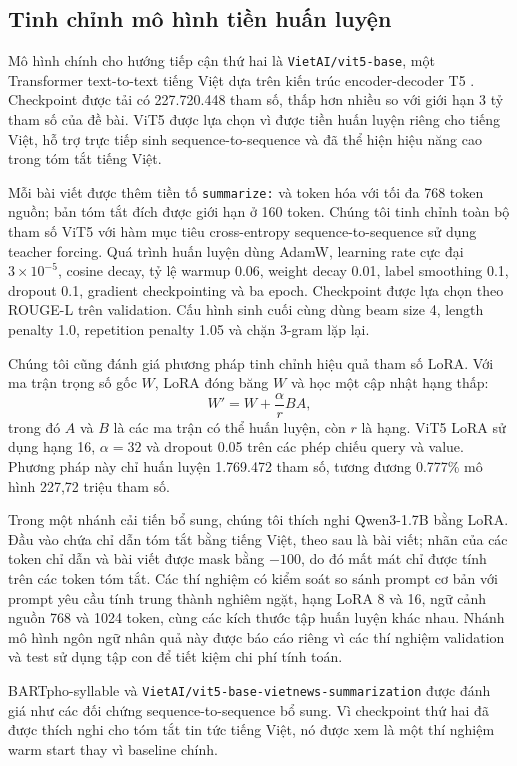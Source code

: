 \documentclass[conference]{IEEEtran}
\begin{document}
\subsection{Tinh chỉnh mô hình tiền huấn luyện}
Mô hình chính cho hướng tiếp cận thứ hai là \texttt{VietAI/vit5-base}, một Transformer text-to-text tiếng Việt dựa trên kiến trúc encoder-decoder T5 \cite{raffel2020t5,phan2022vit5}. Checkpoint được tải có 227.720.448 tham số, thấp hơn nhiều so với giới hạn 3 tỷ tham số của đề bài. ViT5 được lựa chọn vì được tiền huấn luyện riêng cho tiếng Việt, hỗ trợ trực tiếp sinh sequence-to-sequence và đã thể hiện hiệu năng cao trong tóm tắt tiếng Việt.

Mỗi bài viết được thêm tiền tố \texttt{summarize:} và token hóa với tối đa 768 token nguồn; bản tóm tắt đích được giới hạn ở 160 token. Chúng tôi tinh chỉnh toàn bộ tham số ViT5 với hàm mục tiêu cross-entropy sequence-to-sequence sử dụng teacher forcing. Quá trình huấn luyện dùng AdamW, learning rate cực đại $3\times10^{-5}$, cosine decay, tỷ lệ warmup 0.06, weight decay 0.01, label smoothing 0.1, dropout 0.1, gradient checkpointing và ba epoch. Checkpoint được lựa chọn theo ROUGE-L trên validation. Cấu hình sinh cuối cùng dùng beam size 4, length penalty 1.0, repetition penalty 1.05 và chặn 3-gram lặp lại.

Chúng tôi cũng đánh giá phương pháp tinh chỉnh hiệu quả tham số LoRA. Với ma trận trọng số gốc $W$, LoRA đóng băng $W$ và học một cập nhật hạng thấp:
\begin{equation}
W' = W + \frac{\alpha}{r}BA,
\end{equation}
trong đó $A$ và $B$ là các ma trận có thể huấn luyện, còn $r$ là hạng. ViT5 LoRA sử dụng hạng 16, $\alpha=32$ và dropout 0.05 trên các phép chiếu query và value. Phương pháp này chỉ huấn luyện 1.769.472 tham số, tương đương 0.777\% mô hình 227,72 triệu tham số.

Trong một nhánh cải tiến bổ sung, chúng tôi thích nghi Qwen3-1.7B bằng LoRA. Đầu vào chứa chỉ dẫn tóm tắt bằng tiếng Việt, theo sau là bài viết; nhãn của các token chỉ dẫn và bài viết được mask bằng $-100$, do đó mất mát chỉ được tính trên các token tóm tắt. Các thí nghiệm có kiểm soát so sánh prompt cơ bản với prompt yêu cầu tính trung thành nghiêm ngặt, hạng LoRA 8 và 16, ngữ cảnh nguồn 768 và 1024 token, cùng các kích thước tập huấn luyện khác nhau. Nhánh mô hình ngôn ngữ nhân quả này được báo cáo riêng vì các thí nghiệm validation và test sử dụng tập con để tiết kiệm chi phí tính toán.

BARTpho-syllable và \texttt{VietAI/vit5-base-vietnews-summarization} được đánh giá như các đối chứng sequence-to-sequence bổ sung. Vì checkpoint thứ hai đã được thích nghi cho tóm tắt tin tức tiếng Việt, nó được xem là một thí nghiệm warm start thay vì baseline chính.
\end{document}
